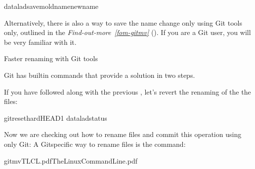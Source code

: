 \begin{sphinxVerbatim}[commandchars=\\\{\}]
dataladsave\PYGZhy{}moldnamenewname
\end{sphinxVerbatim}

\sphinxAtStartPar
Alternatively, there is also a way to save the name change
only using Git tools only, outlined in the \textit{Find-out-more}~{\findoutmoreiconinline}\textit{\ref{fom-gitmv}} {\hyperref[\detokenize{basics/101-136-filesystem:fom-gitmv}]{}} (). If you are a Git user, you will be very familiar with it.

\ignorespaces \begin{findoutmore}[label={fom-gitmv}, before title={\thetcbcounter\ }, float, floatplacement=tb, check odd page=true]{Faster renaming with Git tools}
\label{\detokenize{basics/101-136-filesystem:fom-gitmv}}

\sphinxAtStartPar
Git has built\sphinxhyphen{}in commands that provide a solution in two steps.

\sphinxAtStartPar
If you have followed along with the previous , let’s revert the renaming of the the files:

\begin{sphinxVerbatim}[commandchars=\\\{\}]
gitreset\PYGZhy{}\PYGZhy{}hardHEAD\PYGZti{}1
dataladstatus
\end{sphinxVerbatim}

\sphinxAtStartPar
Now we are checking out how to rename files and commit this operation
using only Git:
A Git\sphinxhyphen{}specific way to rename files is the  command:

\begin{sphinxVerbatim}[commandchars=\\\{\}]
gitmvTLCL.pdfThe\PYGZus{}Linux\PYGZus{}Command\PYGZus{}Line.pdf
\end{sphinxVerbatim}


\end{findoutmore}
